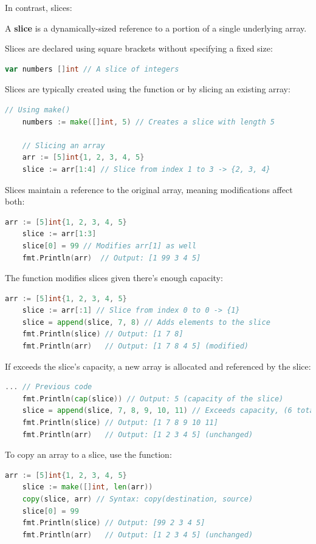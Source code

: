 \newpage
    
\noindent
In contrast, slices:

\begin{Def}[Slices in Go]
    
    A \textbf{slice} is a dynamically-sized reference to a portion of a single underlying array.

    \noindent
    Slices are declared using square brackets without specifying a fixed size:
    \begin{lstlisting}[language=Go]
    var numbers []int // A slice of integers
    \end{lstlisting}
    
    \noindent
    Slices are typically created using the  function or by slicing an existing array:
    \begin{lstlisting}[language=Go]
    // Using make()
    numbers := make([]int, 5) // Creates a slice with length 5
    
    // Slicing an array
    arr := [5]int{1, 2, 3, 4, 5}
    slice := arr[1:4] // Slice from index 1 to 3 -> {2, 3, 4}
    \end{lstlisting}
    
    \noindent
    Slices maintain a reference to the original array, meaning modifications affect both:
    \begin{lstlisting}[language=Go]
    arr := [5]int{1, 2, 3, 4, 5}
    slice := arr[1:3]
    slice[0] = 99 // Modifies arr[1] as well
    fmt.Println(arr)  // Output: [1 99 3 4 5]
    \end{lstlisting}

    \noindent
    The  function modifies slices given there's enough capacity:
    \begin{lstlisting}[language=Go]
    arr := [5]int{1, 2, 3, 4, 5}
    slice := arr[:1] // Slice from index 0 to 0 -> {1}
    slice = append(slice, 7, 8) // Adds elements to the slice
    fmt.Println(slice) // Output: [1 7 8]
    fmt.Println(arr)   // Output: [1 7 8 4 5] (modified)
    \end{lstlisting}

    \noindent
    If  exceeds the slice's capacity, a new array is allocated and referenced by the slice:
    \begin{lstlisting}[language=Go]
    ... // Previous code
    fmt.Println(cap(slice)) // Output: 5 (capacity of the slice)
    slice = append(slice, 7, 8, 9, 10, 11) // Exceeds capacity, (6 total)
    fmt.Println(slice) // Output: [1 7 8 9 10 11]
    fmt.Println(arr)   // Output: [1 2 3 4 5] (unchanged)
    \end{lstlisting}

    \noindent
    To copy an array to a slice, use the  function:
    \begin{lstlisting}[language=Go]
    arr := [5]int{1, 2, 3, 4, 5}
    slice := make([]int, len(arr))
    copy(slice, arr) // Syntax: copy(destination, source)
    slice[0] = 99
    fmt.Println(slice) // Output: [99 2 3 4 5]
    fmt.Println(arr)   // Output: [1 2 3 4 5] (unchanged)
    \end{lstlisting}
\end{Def}

\newpage 

    
